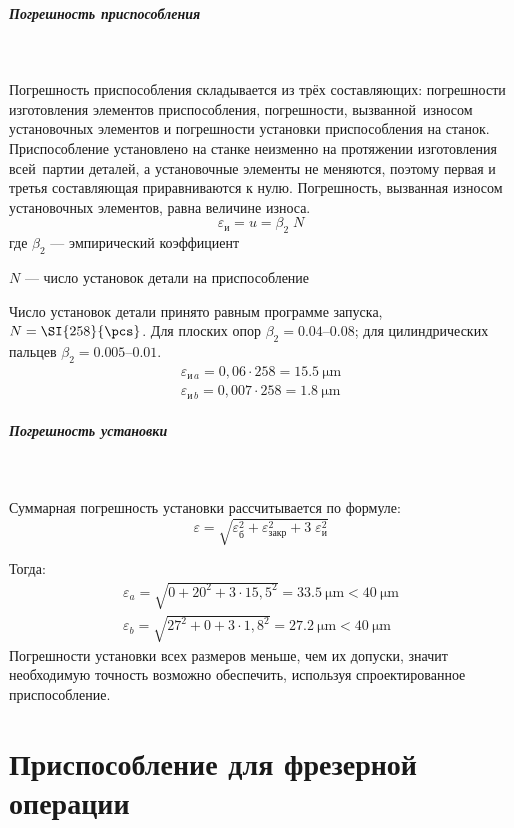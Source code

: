 \documentclass[14pt,russian,a4paper]{extreport}
\begin{document}
\subparagraph{Погрешность приспособления} \

Погрешность приспособления складывается из трёх составляющих: погрешности изготовления элементов приспособления, погрешности, вызванной износом установочных элементов и погрешности установки приспособления на станок. Приспособление установлено на станке неизменно на протяжении изготовления всей партии деталей, а установочные элементы не меняются, поэтому первая и третья составляющая приравниваются к нулю. Погрешность, вызванная износом установочных элементов, равна величине износа.
\begin{equation}
  \varepsilon_{\text{и}} = u = \beta_2 \; N
\end{equation}
где $\beta_2$ --- эмпирический коэффициент \par
$N$ --- число установок детали на приспособление

Число установок детали принято равным программе запуска, $ N = \SI{258}{\pcs} $. Для плоских опор $ \beta_2 = \numrange{0,04}{0,08} $; для цилиндрических пальцев $ \beta_2 = \numrange{0,005}{0,01} $.
\begin{gather*}
  \varepsilon_{\text{и} \, a} = 0,06 \cdot 258 = \SI{15,5}{\micro\meter} \\
  \varepsilon_{\text{и} \, b} = 0,007 \cdot 258 = \SI{1,8}{\micro\meter}
\end{gather*}

\subparagraph{Погрешность установки} \

Суммарная погрешность установки рассчитывается по формуле:
\begin{equation}
  \varepsilon = \sqrt{\varepsilon_\text{б}^2 + \varepsilon_\text{закр}^2 + 3 \; \varepsilon_\text{и}^2}
\end{equation}

Тогда:
\begin{gather*}
  \varepsilon_a = \sqrt{0 + 20^2 + 3 \cdot 15,5^2} = \SI{33,5}{\micro\meter} < \SI{40}{\micro\meter} \\
  \varepsilon_b = \sqrt{27^2 + 0 + 3 \cdot 1,8^2} = \SI{27,2}{\micro\meter} < \SI{40}{\micro\meter}
\end{gather*}
Погрешности установки всех размеров меньше, чем их допуски, значит необходимую точность возможно обеспечить, используя спроектированное приспособление.


\section{Приспособление для фрезерной операции}
\end{document}
